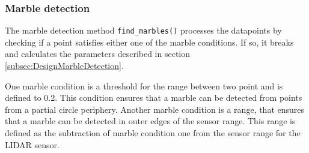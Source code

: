 \documentclass[../Head/Main.tex]{subfiles}
\begin{document}
\subsubsection{Marble detection}
\label{subsubsec:Implementation_marble}
The marble detection method \texttt{find\_marbles()} processes the datapoints by checking if a point satisfies either one of the marble conditions. If so, it breaks and calculates the parameters described in section \ref{subsec:DesignMarbleDetection}.\par 
One marble condition is a threshold for the range between two point and is defined to 0.2. This condition ensures that a marble can be detected from points from a partial circle periphery. Another marble condition is a range, that ensures that a marble can be detected in outer edges of the sensor range. This range is defined as the subtraction of marble condition one from the sensor range for the LIDAR sensor.
\end{document}
